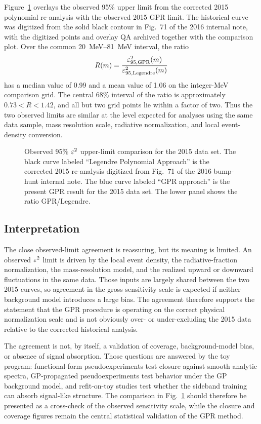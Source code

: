 Figure~\ref{fig:hps2015-legendre-gpr-observed} overlays the observed 95\% upper limit
from the corrected 2015 polynomial re-analysis with the observed 2015 GPR limit.  The
historical curve was digitized from the solid black contour in Fig.~71 of the 2016
internal note, with the digitized points and overlay QA archived together with the
comparison plot.  Over the common \SIrange{20}{81}{MeV} interval, the ratio
\[
R(m) = \frac{\varepsilon^2_{95,\mathrm{GPR}}(m)}
{\varepsilon^2_{95,\mathrm{Legendre}}(m)}
\]
has a median value of 0.99 and a mean value of 1.06 on the integer-MeV comparison
grid.  The central 68\% interval of the ratio is approximately
$0.73<R<1.42$, and all but two grid points lie within a factor of two.  Thus the two
observed limits are similar at the level expected for analyses using the same data
sample, mass resolution scale, radiative normalization, and local event-density
conversion.

\begin{figure}[p]
\centering
{}
\caption{Observed 95\% $\varepsilon^2$ upper-limit comparison for the 2015 data set.  The
black curve labeled ``Legendre Polynomial Approach'' is the corrected 2015
re-analysis digitized from Fig.~71 of the 2016 bump-hunt internal note.  The blue curve
labeled ``GPR approach'' is the present GPR result for the 2015 data set.  The lower
panel shows the ratio GPR/Legendre.}
\label{fig:hps2015-legendre-gpr-observed}
\end{figure}

\subsection{Interpretation}

The close observed-limit agreement is reassuring, but its meaning is limited.  An
observed $\varepsilon^2$ limit is driven by the local event density, the radiative-fraction
normalization, the mass-resolution model, and the realized upward or downward
fluctuations in the same data.  Those inputs are largely shared between the two 2015
curves, so agreement in the gross sensitivity scale is expected if neither background
model introduces a large bias.  The agreement therefore supports the statement that the
GPR procedure is operating on the correct physical normalization scale and is not
obviously over- or under-excluding the 2015 data relative to the corrected historical
analysis.

The agreement is not, by itself, a validation of coverage, background-model bias, or
absence of signal absorption.  Those questions are answered by the toy program:
functional-form pseudoexperiments test closure against smooth analytic spectra,
GP-propagated pseudoexperiments test behavior under the GP background model, and
refit-on-toy studies test whether the sideband training can absorb signal-like
structure.  The comparison in Fig.~\ref{fig:hps2015-legendre-gpr-observed} should
therefore be presented as a cross-check of the observed sensitivity scale, while the
closure and coverage figures remain the central statistical validation of the GPR
method.

